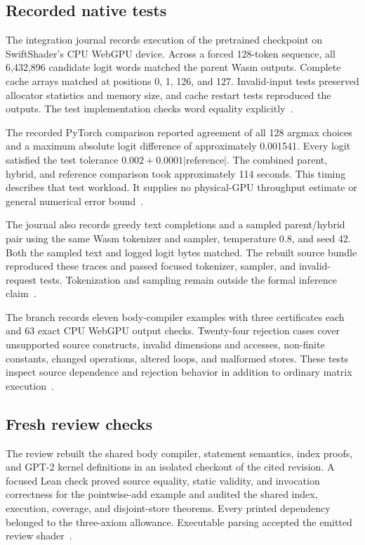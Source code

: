\documentclass[11pt]{article}
\begin{document}
\subsection{Recorded native tests}

The integration journal records execution of the pretrained checkpoint on SwiftShader's CPU WebGPU device.  Across a forced 128-token sequence, all 6,432,896 candidate logit words matched the parent Wasm outputs.  Complete cache arrays matched at positions 0, 1, 126, and 127.  Invalid-input tests preserved allocator statistics and memory size, and cache restart tests reproduced the outputs.  The test implementation checks word equality explicitly~\cite{journal,tests}.

The recorded PyTorch comparison reported agreement of all 128 argmax choices and a maximum absolute logit difference of approximately 0.001541.  Every logit satisfied the test tolerance $0.002+0.0001|\text{reference}|$.  The combined parent, hybrid, and reference comparison took approximately 114 seconds.  This timing describes that test workload.  It supplies no physical-GPU throughput estimate or general numerical error bound~\cite{journal,tests}.

The journal also records greedy text completions and a sampled parent/hybrid pair using the same Wasm tokenizer and sampler, temperature 0.8, and seed 42.  Both the sampled text and logged logit bytes matched.  The rebuilt source bundle reproduced these traces and passed focused tokenizer, sampler, and invalid-request tests.  Tokenization and sampling remain outside the formal inference claim~\cite{journal}.

The branch records eleven body-compiler examples with three certificates each and 63 exact CPU WebGPU output checks.  Twenty-four rejection cases cover unsupported source constructs, invalid dimensions and accesses, non-finite constants, changed operations, altered loops, and malformed stores.  These tests inspect source dependence and rejection behavior in addition to ordinary matrix execution~\cite{bodytests}.

\subsection{Fresh review checks}

The review rebuilt the shared body compiler, statement semantics, index proofs, and GPT-2 kernel definitions in an isolated checkout of the cited revision.  A focused Lean check proved source equality, static validity, and invocation correctness for the pointwise-add example and audited the shared index, execution, coverage, and disjoint-store theorems.  Every printed dependency belonged to the three-axiom allowance.  Executable parsing accepted the emitted review shader~\cite{review}.
\end{document}
